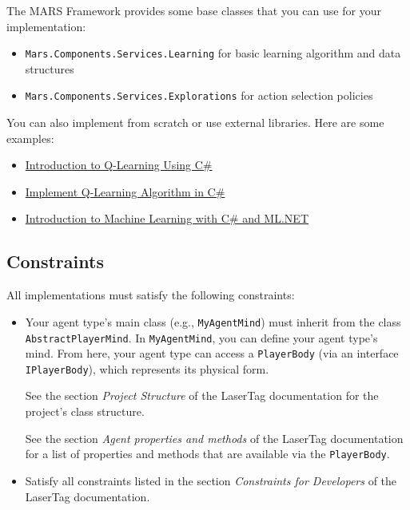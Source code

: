 \documentclass[
    a4paper,
    english,
    DIV=16,
    11pt,
    parskip=half,
]{scrartcl}
\begin{document}
The MARS Framework provides some base classes that you can use for your implementation:
\begin{itemize}
  \item \texttt{Mars.Components.Services.Learning} for basic learning algorithm and data structures
  \item \texttt{Mars.Components.Services.Explorations} for action selection policies
\end{itemize}
You can also implement from scratch or use external libraries. Here are some examples:
\begin{itemize}
  \item \href{https://learn.microsoft.com/en-us/archive/msdn-magazine/2018/august/test-run-introduction-to-q-learning-using-csharp (C\# documentation)}{Introduction to Q-Learning Using C\#}
  \item \href{https://devindeep.com/how-to-implement-q-learning-algorithm-in-c/}{Implement Q-Learning Algorithm in C\#}
  \item \href{https://rubikscode.net/2022/08/29/machine-learning-with-ml-net-introduction/}{Introduction to Machine Learning with C\# and ML.NET}
\end{itemize}

\subsection*{Constraints}
All implementations must satisfy the following constraints:
\begin{itemize}
  \item Your agent type's main class (e.g., \texttt{MyAgentMind}) must inherit from the class \texttt{AbstractPlayerMind}. In \texttt{MyAgentMind}, you can define your agent type's mind. From here, your agent type can access a \texttt{PlayerBody} (via an interface \texttt{IPlayerBody}), which represents its physical form.
  
  \faLightbulbO\: See the section \emph{Project Structure} of the LaserTag documentation for the project's class structure.
  
  \faLightbulbO\: See the section \emph{Agent properties and methods} of the LaserTag documentation for a list of properties and methods that are available via the \texttt{PlayerBody}.

  \item Satisfy all constraints listed in the section \emph{Constraints for Developers} of the LaserTag documentation.
\end{itemize}
\end{document}
